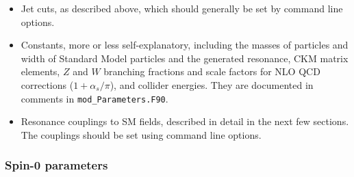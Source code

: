 \documentclass[aps,superscriptaddress,nofootinbib]{revtex4}
\begin{document}
\begin{itemize}
\item
Jet cuts, as described above, which should generally be set by command line options.

\item Constants, more or less self-explanatory, including the masses of particles and width of Standard Model particles and the generated resonance, CKM matrix elements, $Z$ and $W$ branching fractions and scale factors for NLO QCD corrections ($1+\alpha_s/\pi$), and collider energies.  They are documented in comments in \verb|mod_Parameters.F90|.

\item Resonance couplings to SM fields, described in detail in the next few sections.  The couplings should be set using command line options.
\end{itemize}

\subsubsection{ Spin-0 parameters }
\label{spin0}
\end{document}
